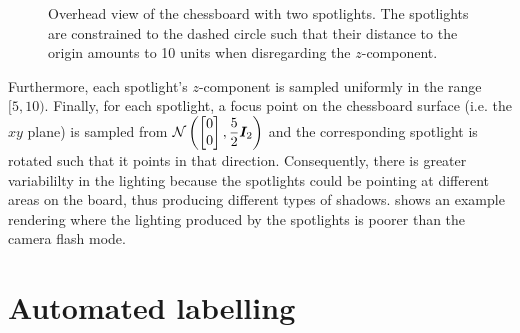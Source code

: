 \documentclass[../main.tex]{subfiles}
\begin{document}
\begin{enumerate}
\begin{figure}
            \caption[Overhead view of the chessboard with two spotlights.]{Overhead view of the chessboard with two spotlights. The spotlights are constrained to the dashed circle such that their distance to the origin amounts to 10 units when disregarding the $z$-component.}
            \label{fig:chessboard_lighting_circle}
        \end{figure}
        Furthermore, each spotlight's $z$-component is sampled uniformly in the range $[5, 10)$.
        Finally, for each spotlight, a focus point on the chessboard surface (i.e. the $xy$ plane) is sampled from
        \(
            \mathcal{N}\left(
                \begin{bmatrix}
                    0 \\ 0
                \end{bmatrix},
                \displaystyle \frac{5}{2} {\bm{I}}_2
            \right)
        \)
        and the corresponding spotlight is rotated such that it points in that direction.
        Consequently, there is greater variabililty in the lighting because the spotlights could be pointing at different areas on the board, thus producing different types of shadows.
         shows an example rendering where the lighting produced by the spotlights is poorer than the camera flash mode.
\end{enumerate}

\section{Automated labelling}
\end{document}
